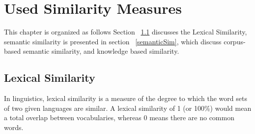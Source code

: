 
\chapter{Used Similarity Measures} %

\label{sim} %



This chapter is organized as follows Section ~\ref{lexicalsim} discusses the Lexical Similarity, semantic similarity is presented in section ~\ref{semanticSim}, which discuss corpus-based semantic similarity, and knowledge based similarity.

\section{Lexical Similarity}
\label {lexicalsim}
In linguistics, lexical similarity is a measure of the degree to which the word sets of two given languages  are similar. A lexical similarity of 1 (or 100\%) would mean a total overlap between vocabularies, whereas 0 means there are no common words.\\


